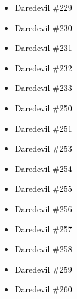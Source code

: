 \documentclass[12pt]{article}
\newcommand{\checkbox}{\raisebox{0.0ex}{\fbox{\rule{0ex}{1.5ex} \rule{1.5ex}{0ex}}}}
\begin{document}
\vspace{0.3cm}
\noindent
\begin{tcolorbox}[
  colback=white!95!gray,
  colframe=black,
  width=\textwidth,
  arc=4mm,
  auto outer arc,
  boxrule=0.8pt,
  left=8pt,right=8pt,top=8pt,bottom=8pt
]
\begin{itemize}[left=0pt,label={\checkbox}]
    \item \textcolor{black}{Daredevil \#229}
    \item \textcolor{black}{Daredevil \#230}
    \item \textcolor{black}{Daredevil \#231}
    \item \textcolor{black}{Daredevil \#232}
    \item \textcolor{black}{Daredevil \#233}
    \item \textcolor{black}{Daredevil \#250}
    \item \textcolor{black}{Daredevil \#251}
    \item \textcolor{black}{Daredevil \#253}
    \item \textcolor{black}{Daredevil \#254}
    \item \textcolor{black}{Daredevil \#255}
    \item \textcolor{black}{Daredevil \#256}
    \item \textcolor{black}{Daredevil \#257}
    \item \textcolor{black}{Daredevil \#258}
    \item \textcolor{black}{Daredevil \#259}
    \item \textcolor{black}{Daredevil \#260}
\end{itemize}
\end{tcolorbox}

\newpage
{}
\end{document}
